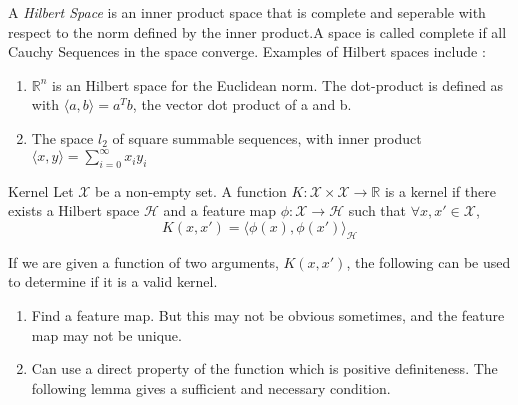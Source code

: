 \documentclass[12pt]{article}
\begin{document}
A \textit{Hilbert Space} is an inner product space that is complete and seperable with respect to the 
norm defined by the inner product.A space is called complete if all Cauchy Sequences in the space converge.
Examples of Hilbert spaces include :
\begin{enumerate}
    \item $\mathbb{R}^{n}$ is an Hilbert space for the Euclidean norm. The dot-product is defined as with $\langle a,b\rangle = a^Tb$, the vector dot product of a and b.
    \item The space $l_{2}$ of square summable sequences, with inner product $\langle x,y \rangle = \sum_{i=0}^{\infty} x_{i}y_i$
\end{enumerate}

\vspace{2mm} %
\begin{definition}{Kernel}
\newline
Let $\mathcal{X}$ be a non-empty set. A function $K: \mathcal{X} \times \mathcal{X} \rightarrow \mathbb{R}$ is a kernel 
if there exists a Hilbert space $\mathcal{H}$ and a feature map $\phi : \mathcal{X} \rightarrow \mathcal{H}$ such that
$\forall x,x' \in \mathcal{X}$, 
\[K(x,x') = \langle \phi(x), \phi(x') \rangle_{\mathcal{H}}\]
\end{definition}
\newline
If we are given a function of two arguments, $K(x,x')$, the following can be used to determine if it is a valid kernel.
\begin{enumerate}
    \item Find a feature map. But this may not be obvious sometimes, and the feature map may not be unique.
    \item Can use a direct property of the function which is positive definiteness. The following lemma gives a sufficient and necessary condition.
\end{enumerate}

\vspace{2mm} %
\end{document}
